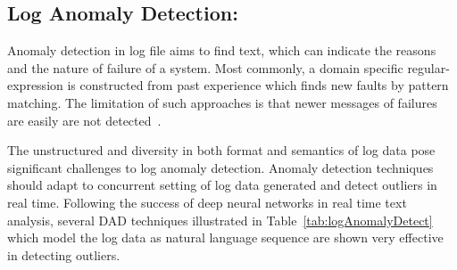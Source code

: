 \subsection{Log Anomaly Detection:}
Anomaly detection in log file aims to find text, which can indicate the reasons and the nature of failure of a system. Most commonly, a domain  specific regular-expression  is constructed from past experience which finds new faults by pattern matching. The limitation of such approaches is that newer messages of failures are easily are not detected~\cite{memon2008log}.

The unstructured and diversity in both format and semantics of log data pose significant challenges to log anomaly detection. Anomaly detection techniques should adapt to concurrent setting of log data generated and detect outliers in real time. Following the success of deep neural networks in real time text analysis, several DAD techniques illustrated in Table~\ref{tab:logAnomalyDetect} which model the log data as natural language sequence are shown very effective in detecting outliers.

